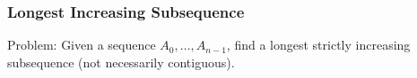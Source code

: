\documentclass{beamer}
\begin{document}
\hypertarget{slide:LIS}{}

\label{slides:LIS}

\begin{frame}%
\frametitle{Longest Increasing Subsequence}

\begin{mdframed}[style=exampledefault]
Problem: Given a sequence $A_0, \ldots, A_{n-1}$, find a longest strictly increasing subsequence (not necessarily contiguous).
\end{mdframed}

\vspace{0.5cm}


\end{frame}
\end{document}
